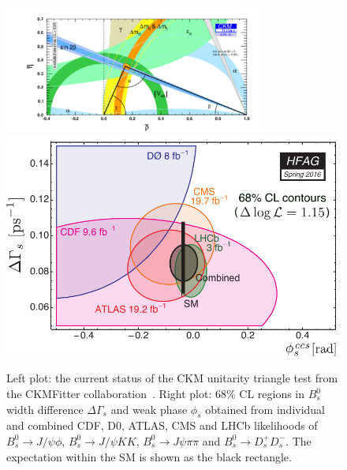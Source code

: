 
\begin{figure}[!htb]
\begin{center}
\includegraphics[width=8.5cm]{rhoeta_small_global.pdf}
\includegraphics[width=7.cm]{hfag_Spring2016_DGsphis_zoom.pdf}
\end{center}
\caption{Left plot: the current status of the CKM unitarity triangle test from the CKMFitter collaboration~\cite{Charles:2004jd}.  Right plot: 68\% CL regions in $B^{0}_{s}$ width difference $\Delta\Gamma_{s}$
and weak phase $\phi_{s}$ obtained from individual and combined CDF, D0,
ATLAS, CMS and LHCb likelihoods of $B^{0}_{s}\to J/\psi\phi$, $B^{0}_{s}\to
J/\psi KK$, $B^{0}_{s}\to J\psi\pi\pi$ and $B^{0}_{s}\to D_{s}^{+}D_{s}^{-}%
$. The expectation within the SM is shown as the black rectangle. }%
\label{figphis}%
\end{figure}



